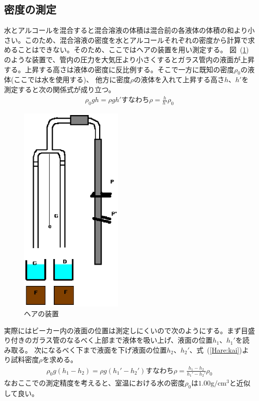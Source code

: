 \documentclass[a4j,10pt]{jarticle}
\newcommand{\Equref}[1]{式~(\ref{#1})}
\newcommand{\Figref}[1]{図~(\ref{#1})}
\begin{document}
\subsection{密度の測定}
水とアルコールを混合すると混合溶液の体積は混合前の各液体の体積の和より小さい。このため、混合溶液の密度を水とアルコールそれぞれの密度から計算で求めることはできない。そのため、ここではヘアの装置を用い測定する。
\Figref{Hare}のような装置で、管内の圧力を大気圧より小さくするとガラス管内の液面が上昇する。上昇する高さは液体の密度に反比例する。そこで一方に既知の密度$\rho_{0}$の液体(ここでは水を使用する)、
他方に密度$\rho$の液体を入れて上昇する高さ$h$、$h'$を測定すると次の関係式が成り立つ。
\begin{eqnarray}
\label{Harerho}
\rho_0 gh =\rho gh' すなわち \rho=\frac{h}{h'}\rho_0
\end{eqnarray}
\begin{figure}[h]
\begin{center}
\includegraphics[width=5cm]{hare.eps}
\caption{ヘアの装置}
\label{Hare}
\end{center}
\end{figure}
実際にはビーカー内の液面の位置は測定しにくいので次のようにする。まず目盛り付きのガラス管のなるべく上部まで液体を吸い上げ、液面の位置$h_1$、$h_{1}'$を読み取る。
次になるべく下まで液面を下げ液面の位置$h_2$、$h_{2}'$、\Equref{Hare:kai}より試料密度$\rho$を求める。
\begin{eqnarray}
\label{Hare:kai}
\rho_0 g(h_1-h_2) = \rho g (h_{1}'-h_{2}') すなわち \rho = \frac{h_1-h_2}{h_{1}'-h_{2}'}\rho_0
\end{eqnarray}
なおここでの測定精度を考えると、室温における水の密度$\rho_0$は$1.00\mathrm{g/cm^3}$と近似して良い。
\end{document}
